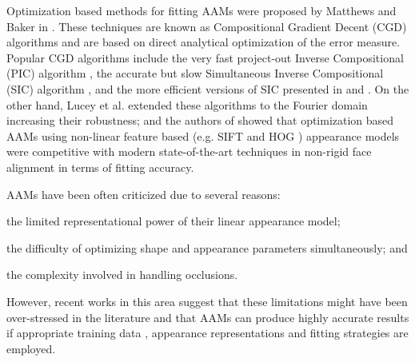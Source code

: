 Optimization based methods for fitting AAMs were proposed by Matthews and Baker in \cite{Matthews2004}. These techniques are known as Compositional Gradient Decent (CGD) algorithms and are based on direct analytical optimization of the error measure. Popular CGD algorithms include the very fast project-out Inverse Compositional (PIC) algorithm \cite{Matthews2004}, the accurate but slow Simultaneous Inverse Compositional (SIC) algorithm \cite{Gross2005}, and the more efficient versions of SIC presented in \cite{Papandreou2008} and \cite{Tzimiropoulos2013}. On the other hand, Lucey et al. \cite{Lucey2013} extended these algorithms to the Fourier domain increasing their robustness; and the authors of \cite{Antonakos2014} showed that optimization based AAMs using non-linear feature based (e.g. SIFT\cite{Lowe1999} and HOG \cite{Dalal2005}) appearance models were competitive with modern state-of-the-art techniques in non-rigid face alignment \cite{Xiong2013, Asthana2013} in terms of fitting accuracy.

AAMs have been often criticized due to several reasons: 
\begin{inparaenum} 
\item the limited representational power of their linear appearance model; 
\item the difficulty of optimizing shape and appearance parameters simultaneously; and
\item the complexity involved in handling occlusions. 
\end{inparaenum}
However, recent works in this area \cite{Papandreou2008, Saragih2009,Tresadern2010, Lucey2013, Tzimiropoulos2013, Antonakos2014} suggest that these limitations might have been over-stressed in the literature and that AAMs can produce highly accurate results if appropriate training data \cite{Tzimiropoulos2013}, appearance representations \cite{Tresadern2010, Lucey2013, Antonakos2014} and fitting strategies \cite{Papandreou2008, Saragih2009, Tresadern2010, Tzimiropoulos2013} are employed.

